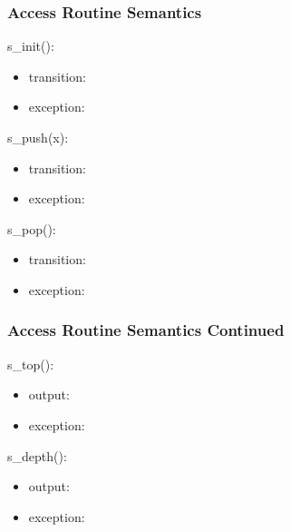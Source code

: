 \documentclass[t,12pt,numbers,fleqn,handout]{beamer}
\begin{document}
\begin{frame}
\frametitle{Access Routine Semantics}

s\_init():
\begin{itemize}
\item transition: 
\item exception: 
\end{itemize}

\noindent s\_push(x):
\begin{itemize}
\item transition: 
\item exception: 
\end{itemize}

\noindent s\_pop():
\begin{itemize}
\item transition: 
\item exception: 
\end{itemize}

\end{frame}


\begin{frame}
\frametitle{Access Routine Semantics Continued}

\noindent s\_top():
\begin{itemize}
\item output: 
\item exception: 
\end{itemize}

\noindent s\_depth():
\begin{itemize}
\item output: 
\item exception: 
\end{itemize}

\end{frame}

\end{document}
